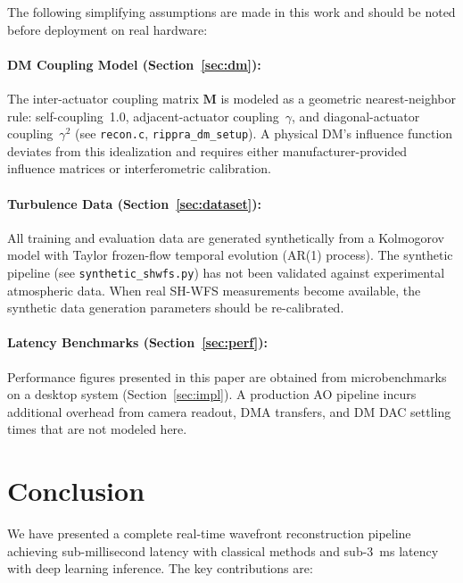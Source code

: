 \documentclass[twocolumn,10pt]{IEEEtran}
\begin{document}
The following simplifying assumptions are made in this work and should be noted before deployment on real hardware:

\paragraph{DM Coupling Model (Section~\ref{sec:dm}):}
The inter-actuator coupling matrix $\mathbf{M}$ is modeled as a geometric nearest-neighbor rule: self-coupling~1.0, adjacent-actuator coupling~$\gamma$, and diagonal-actuator coupling~$\gamma^2$ (see \texttt{recon.c}, \texttt{rippra\_dm\_setup}). A physical DM's influence function deviates from this idealization and requires either manufacturer-provided influence matrices or interferometric calibration.

\paragraph{Turbulence Data (Section~\ref{sec:dataset}):}
All training and evaluation data are generated synthetically from a Kolmogorov model with Taylor frozen-flow temporal evolution (AR(1) process). The synthetic pipeline (see \texttt{synthetic\_shwfs.py}) has not been validated against experimental atmospheric data. When real SH-WFS measurements become available, the synthetic data generation parameters should be re-calibrated.

\paragraph{Latency Benchmarks (Section~\ref{sec:perf}):}
Performance figures presented in this paper are obtained from microbenchmarks on a desktop system (Section~\ref{sec:impl}). A production AO pipeline incurs additional overhead from camera readout, DMA transfers, and DM DAC settling times that are not modeled here.

\section{Conclusion}
\label{sec:conclusion}

We have presented a complete real-time wavefront reconstruction pipeline achieving sub-millisecond latency with classical methods and sub-3~ms latency with deep learning inference. The key contributions are:
\end{document}
